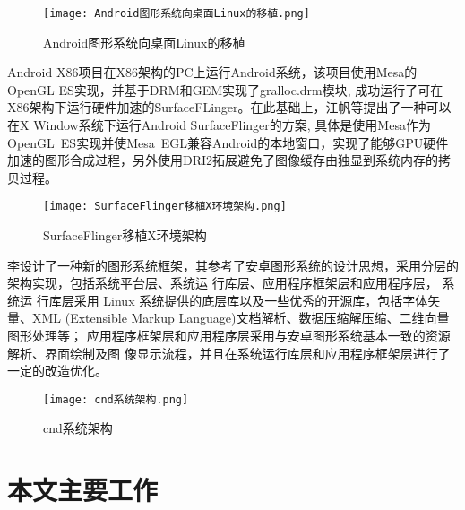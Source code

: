 \begin{figure}[h]
  \centering
  \texttt{[image: Android图形系统向桌面Linux的移植.png]}
  \caption{Android图形系统向桌面Linux的移植}\cite{张超2012Android}
\end{figure}

Android X86\cite{AndroidX86}项目在X86架构的PC上运行Android系统，该项目使用Mesa\cite{mesa3d}的OpenGL ES实现，并基于DRM\cite{DRM}和GEM\cite{GEM}实现了gralloc.drm模块,
成功运行了可在X86架构下运行硬件加速的SurfaceFLinger。在此基础上，江帆等\cite{XTYY201710015}提出了一种可以在X Window系统下运行Android SurfaceFlinger的方案,
具体是使用Mesa作为OpenGL ES实现并使Mesa EGL兼容Android的本地窗口，实现了能够GPU硬件加速的图形合成过程，另外使用DRI2拓展避免了图像缓存由独显到系统内存的拷贝过程。

\begin{figure}[H]
  \centering
  \texttt{[image: SurfaceFlinger移植X环境架构.png]}
  \caption{SurfaceFlinger移植X环境架构}\cite{XTYY201710015}
\end{figure}

李\cite{1016779798.nh}设计了一种新的图形系统框架，其参考了安卓图形系统的设计思想，采用分层的架构实现，包括系统平台层、系统运 行库层、应用程序框架层和应用程序层，
系统运 行库层采用 Linux 系统提供的底层库以及一些优秀的开源库，包括字体矢量、XML (Extensible Markup Language)文档解析、数据压缩解压缩、二维向量图形处理等；
应用程序框架层和应用程序层采用与安卓图形系统基本一致的资源解析、界面绘制及图 像显示流程，并且在系统运行库层和应用程序框架层进行了一定的改造优化。
\begin{figure}[H]
  \centering
  \texttt{[image: cnd系统架构.png]}
  \caption{cnd系统架构}\cite{1016779798.nh}
\end{figure}

\section{本文主要工作}

